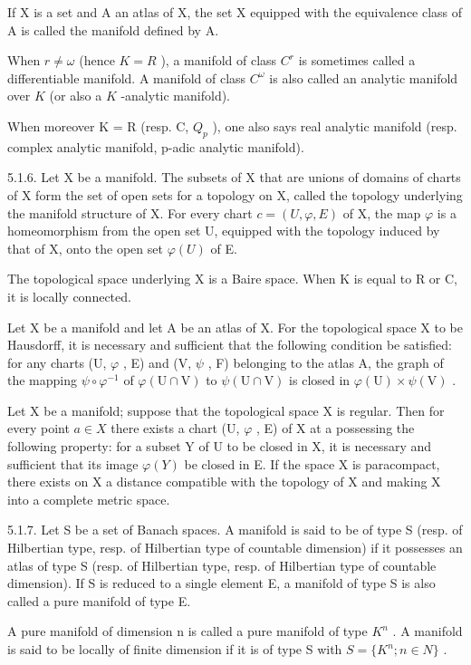 If X is a set and A an atlas of X, the set X equipped with the equivalence class of A is called the manifold defined by A.

When \(r \neq \omega\) (hence \(K = R\) ), a manifold of class \(C^r\) is sometimes called a differentiable manifold. A manifold of class \(C^\omega\) is also called an analytic manifold over \(K\) (or also a \(K\) -analytic manifold).

When moreover K = R (resp. C, \(Q_{p}\) ), one also says real analytic manifold (resp. complex analytic manifold, p-adic analytic manifold).

5.1.6. Let X be a manifold. The subsets of X that are unions of domains of charts of X form the set of open sets for a topology on X, called the topology underlying the manifold structure of X. For every chart \(c = (U, \varphi, E)\) of X, the map \(\varphi\) is a homeomorphism from the open set U, equipped with the topology induced by that of X, onto the open set \(\varphi(U)\) of E.

The topological space underlying X is a Baire space. When K is equal to R or C, it is locally connected.

Let X be a manifold and let A be an atlas of X. For the topological space X to be Hausdorff, it is necessary and sufficient that the following condition be satisfied: for any charts (U, \(\varphi\) , E) and (V, \(\psi\) , F) belonging to the atlas A, the graph of the mapping \(\psi \circ \varphi^{-1}\) of \(\varphi(\mathrm{U} \cap \mathrm{V})\) to \(\psi(\mathrm{U} \cap \mathrm{V})\) is closed in \(\varphi(\mathrm{U}) \times \psi(\mathrm{V})\) .

Let X be a manifold; suppose that the topological space X is regular. Then for every point \(a \in X\) there exists a chart (U, \(\varphi\) , E) of X at a possessing the following property: for a subset Y of U to be closed in X, it is necessary and sufficient that its image \(\varphi(Y)\) be closed in E. If the space X is paracompact, there exists on X a distance compatible with the topology of X and making X into a complete metric space.

5.1.7. Let S be a set of Banach spaces. A manifold is said to be of type S (resp. of Hilbertian type, resp. of Hilbertian type of countable dimension) if it possesses an atlas of type S (resp. of Hilbertian type, resp. of Hilbertian type of countable dimension). If S is reduced to a single element E, a manifold of type S is also called a pure manifold of type E.

A pure manifold of dimension n is called a pure manifold of type \(K^{n}\) . A manifold is said to be locally of finite dimension if it is of type S with \(S = \{K^{n}; n \in N\}\) .


